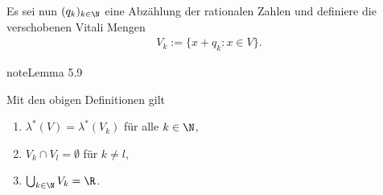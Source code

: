 \documentclass[letterpaper,10pt,german]{jupyterBook}
\begin{document}
\sphinxAtStartPar
Es sei nun \((q_k)_{k\in\N}\) eine Abzählung der rationalen Zahlen und definiere die verschobenen Vitali Mengen
\begin{equation*}
\begin{split}V_k :=\{x+q_k: x\in V\}.\end{split}
\end{equation*}\label{masstheorie/masstheorie:lemma-38}
\begin{sphinxadmonition}{note}{Lemma 5.9}



\sphinxAtStartPar
Mit den obigen Definitionen gilt
\begin{enumerate}
%
\item {} 
\sphinxAtStartPar
\(\lambda^\ast(V) = \lambda^\ast(V_k)\) für alle \(k\in\N\),

\item {} 
\sphinxAtStartPar
\(V_k\cap V_l=\emptyset\) für \(k\neq l\),

\item {} 
\sphinxAtStartPar
\(\bigcup_{k\in\N} V_k = \R\).

\end{enumerate}
\end{sphinxadmonition}
\end{document}
